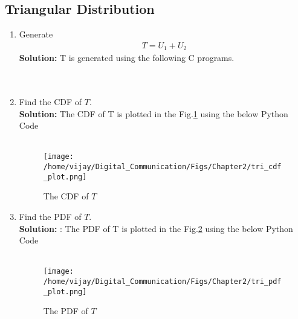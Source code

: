 \documentclass[journal,10pt,twocolumn]{IEEEtran}
\newcounter{Chapcounter}
\numberwithin{equation}{subsection}
\numberwithin{figure}{subsection}
\renewcommand\thesection{\theChapcounter.\arabic{section}}
\newcommand{\solution}{\noindent \textbf{Solution: }}
\renewcommand\thesection{\arabic{section}}
\renewcommand\thesubsection{\thesection.\arabic{subsection}}
\begin{document}
\subsection{\textbf{Triangular Distribution}}
\begin{enumerate}[label=\thesubsection.\arabic*,ref=\thesubsection.\arabic{figure}]
%
\item Generate 
	\begin{align}
		T = U_1+U_2
	\end{align}
\solution T is generated using the following C programs.\\

\\

\\

\item Find the CDF of $T$.\\
\solution
The CDF of T is plotted in the Fig.\ref{fig:tri_cdf11} using the below Python Code\\ 

\\


\begin{figure}[!ht]
\centering
\texttt{[image: /home/vijay/Digital\_Communication/Figs/Chapter2/tri\_cdf\_plot.png]} 
\caption{The CDF of $T$}
\label{fig:tri_cdf11}
\end{figure}


\item Find the PDF of $T$.\\
\solution: The PDF of T is plotted in the Fig.\ref{fig:tri_pdf11} using the below Python Code\\ 

\\


\begin{figure}[!ht]
\centering
\texttt{[image: /home/vijay/Digital\_Communication/Figs/Chapter2/tri\_pdf\_plot.png]} 
\caption{The PDF of $T$}
\label{fig:tri_pdf11}
\end{figure}


\end{enumerate}
\end{document}
